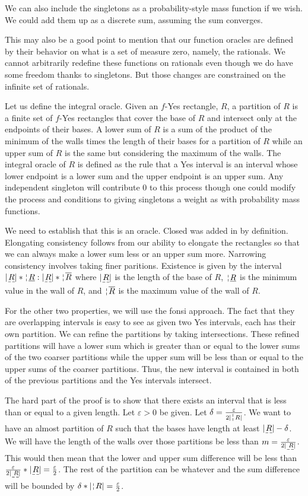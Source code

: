 \documentclass[12pt]{article}
\begin{document}
We can also include the singletons as a probability-style mass function if we wish. We could add them up as a discrete sum, assuming the sum converges. 

This may also be a good point to mention that our function oracles are defined by their behavior on what is a set of measure zero, namely, the rationals. We cannot arbitrarily redefine these functions on rationals even though we do have some freedom thanks to singletons. But those changes are constrained on the infinite set of rationals. 

Let us define the integral oracle. Given an $f$-Yes rectangle, $R$, a partition of $R$ is a finite set of $f$-Yes rectangles that cover the base of $R$ and intersect only at the endpoints of their bases. A lower sum of $R$ is a sum of the product of the minimum of the walls times the length of their bases for a partition of $R$ while an upper sum of $R$ is the same but considering the maximum of the walls. The integral oracle of $R$ is defined as the rule that a Yes interval is an interval whose lower endpoint is a lower sum and the upper endpoint is an upper sum. Any independent singleton will contribute 0 to this process though one could modify the process and conditions to giving singletons a weight as with probability mass functions. 

We need to establish that this is an oracle. Closed was added in by definition. Elongating consistency follows from our ability to elongate the rectangles so that we can always make a lower sum less or an upper sum more. Narrowing consistency involves taking finer paritions. Existence is given by the interval $|\base{R}|*\wall{\underline{R}}: |\base{R}|*\wall{\overline{R}}$ where $|\base{R}|$ is the length of the base of $R$, $\wall{\underline{R}}$ is the minimum value in the wall of $R$, and $\wall{\overline{R}}$ is the maximum value of the wall of $R$. 

For the other two properties, we will use the fonsi approach. The fact that they are overlapping intervals is easy to see as given two Yes intervals, each has their own partition. We can refine the partitions by taking intersections. These refined partitions will have a lower sum which is greater than or equal to the lower sums of the two coarser partitions while the upper sum will be less than or equal to the upper sums of the coarser partitions. Thus, the new interval is contained in both of the previous partitions and the Yes intervals intersect. 

The hard part of the proof is to show that there exists an interval that is less than or equal to a given length. Let $\varepsilon > 0$ be given. Let $\delta = \frac{\varepsilon}{2|\wall{R}|}$. We want to have an almost partition of $R$ such that the bases have length at least $|\base{R}| - \delta$. We will have the length of the walls over those partitions be less than $m = \frac{\varepsilon}{2|\base{R}|}$. This would then mean that the lower and upper sum difference will be less than $\frac{\varepsilon}{2|\base{R}|} * |\base{R}| = \frac{\varepsilon}{2}$. The rest of the partition can be whatever and the sum difference will be bounded by $\delta * |\wall{R}| = \frac{\varepsilon}{2}$.
\end{document}
